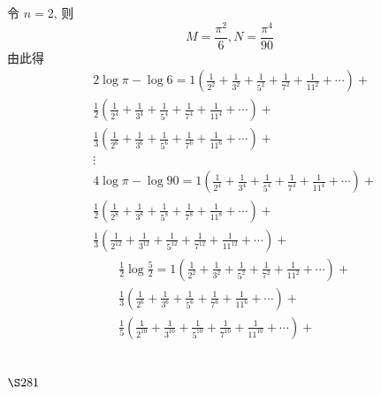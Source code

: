 令 $n=2$, 则
\[
M=\frac{\pi^{2}}{6}, N=\frac{\pi^{4}}{90}
\]
由此得
\[
\begin{aligned}
& 2 \log \pi-\log 6= 1\left(\frac{1}{2^{2}}+\frac{1}{3^{2}}+\frac{1}{5^{2}}+\frac{1}{7^{2}}+\frac{1}{11^{2}}+\cdots\right)+ \\
& \frac{1}{2}\left(\frac{1}{2^{4}}+\frac{1}{3^{4}}+\frac{1}{5^{4}}+\frac{1}{7^{4}}+\frac{1}{11^{4}}+\cdots\right)+ \\
& \frac{1}{3}\left(\frac{1}{2^{6}}+\frac{1}{3^{6}}+\frac{1}{5^{6}}+\frac{1}{7^{6}}+\frac{1}{11^{6}}+\cdots\right)+ \\
& \vdots \\
& 4 \log \pi-\log 90= 1\left(\frac{1}{2^{4}}+\frac{1}{3^{4}}+\frac{1}{5^{4}}+\frac{1}{7^{4}}+\frac{1}{11^{4}}+\cdots\right)+ \\
& \frac{1}{2}\left(\frac{1}{2^{8}}+\frac{1}{3^{8}}+\frac{1}{5^{8}}+\frac{1}{7^{8}}+\frac{1}{11^{8}}+\cdots\right)+ \\
& \frac{1}{3}\left(\frac{1}{2^{12}}+\frac{1}{3^{12}}+\frac{1}{5^{12}}+\frac{1}{7^{12}}+\frac{1}{11^{12}}+\cdots\right)+
\end{aligned}
\]
\[
\begin{aligned}
& \frac{1}{2} \log \frac{5}{2}=1\left(\frac{1}{2^{2}}+\frac{1}{3^{2}}+\frac{1}{5^{2}}+\frac{1}{7^{2}}+\frac{1}{11^{2}}+\cdots\right)+ \\
& \frac{1}{3}\left(\frac{1}{2^{6}}+\frac{1}{3^{6}}+\frac{1}{5^{6}}+\frac{1}{7^{6}}+\frac{1}{11^{6}}+\cdots\right)+ \\
& \frac{1}{5}\left(\frac{1}{2^{10}}+\frac{1}{3^{10}}+\frac{1}{5^{10}}+\frac{1}{7^{10}}+\frac{1}{11^{10}}+\cdots\right)+
\end{aligned}
\]
\section{$\S 281$}


